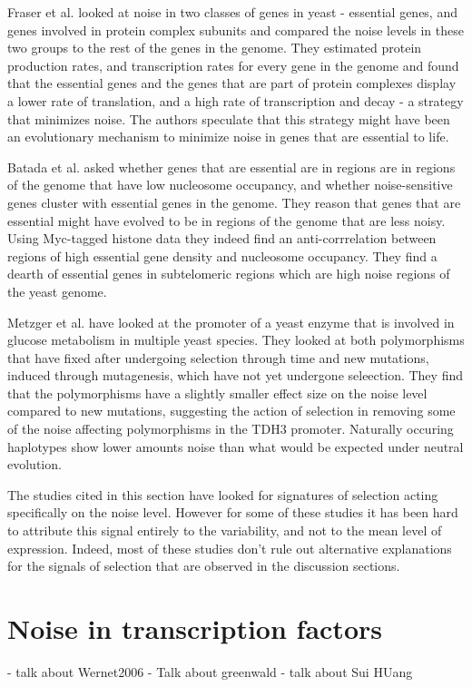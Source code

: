 Fraser et al. \cite{Fraser} looked at noise in two classes of genes in yeast - essential genes, and genes involved in protein complex subunits and compared the noise levels in these two groups to the rest of the genes in the genome. They estimated protein production rates, and transcription rates for every gene in the genome and found that the essential genes and the genes that are part of protein complexes display a lower rate of translation, and a high rate of transcription and decay - a strategy that minimizes noise. The authors speculate that this strategy might have been an evolutionary mechanism to minimize noise in genes that are essential to life.

Batada et al. \cite{Batada} asked whether genes that are essential are in regions are in regions of the genome that have low nucleosome occupancy, and whether noise-sensitive genes cluster with essential genes in the genome. They reason that genes that are essential might have evolved to be in regions of the genome that are less noisy. Using Myc-tagged histone data they indeed find an anti-corrrelation between regions of high essential gene density and nucleosome occupancy. They find a dearth of essential genes in subtelomeric regions which are high noise regions of the yeast genome.

Metzger et al. \cite{Metzger} have looked at the promoter of a yeast enzyme that is involved in glucose metabolism in multiple yeast species. They looked at both polymorphisms that have fixed after undergoing selection through time and new mutations, induced through mutagenesis, which have not yet undergone seleection. They find that the polymorphisms have a slightly smaller effect size on the noise level compared to new mutations, suggesting the action of selection in removing some of the noise affecting polymorphisms in the TDH3 promoter. Naturally occuring haplotypes show lower amounts noise than what would be expected under neutral evolution.

The studies cited in this section have looked for signatures of selection acting specifically on the noise level. However for some of these studies it has been hard to attribute this signal entirely to the variability, and not to the mean level of expression. Indeed, most of these studies don't rule out alternative explanations for the signals of selection that are observed in the discussion sections.

\section{Noise in transcription factors}
- talk about Wernet2006
- Talk about greenwald
- talk about Sui HUang

